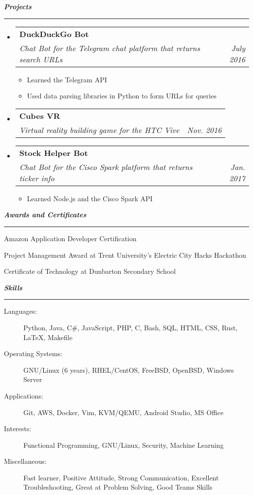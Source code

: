 \documentclass[letterpaper,11pt]{article}
\makeatletter
\newcommand{\resitem}[1]{\item #1 \vspace{-2pt}}
\newcommand{\mysection}[1]{\vspace{5pt} {\bfseries \textsl{#1}} \\ {\color{gray} \rule[5pt]{\textwidth}{1pt}}}
\newcommand{\ressubheading}[4]{\begin{tabular*}{6.5in}{l@{\extracolsep{\fill}}r}
        \textbf{#1} & #2 \\
        \textit{#3} & \textit{#4} \\
\end{tabular*}\vspace{-6pt}}
\makeatother
\begin{document}
\mysection{Projects}
\begin{itemize}
    \item
        \ressubheading{DuckDuckGo Bot}{}{Chat Bot for the Telegram chat platform that returns search URLs}{July 2016}
        \begin{itemize}
                \resitem{Learned the Telegram API}
                \resitem{Used data parsing libraries in Python to form URLs for queries}
        \end{itemize}

    \item
        \ressubheading{Cubes VR}{}{Virtual reality building game for the HTC Vive}{Nov. 2016}

    \item
        \ressubheading{Stock Helper Bot}{}{Chat Bot for the Cisco Spark platform that returns ticker info}{Jan. 2017}
        \begin{itemize}
                \resitem{Learned Node.js and the Cisco Spark API}
        \end{itemize}
\end{itemize}

\mysection{Awards and Certificates}
\begin{description}
    \item Amazon Application Developer Certification
    \item Project Management Award at Trent University's Electric City Hacks Hackathon
    \item Certificate of Technology at Dunbarton Secondary School
\end{description}

\mysection{Skills}
\begin{description}
    \item[Languages:]
        Python, Java, C\#, JavaScript, PHP, C, Bash, SQL, HTML, CSS, Rust, \LaTeX{}, Makefile
    \item[Operating Systems:]
        GNU/Linux (6 years), RHEL/CentOS, FreeBSD, OpenBSD, Windows Server
    \item[Applications:]
        Git, AWS, Docker, Vim, KVM/QEMU, Android Studio, MS Office
    \item[Interests:]
        Functional Programming, GNU/Linux, Security, Machine Learning
    \item[Miscellaneous:]
        Fast learner, Positive Attitude, Strong Communication, Excellent Troubleshooting, Great at Problem Solving, Good Teams Skills
\end{description}
\end{document}

